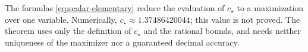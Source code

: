 The formulas \eqref{eq:scalar-elementary} reduce the evaluation of
$c_\star$ to a maximization over one variable. Numerically,
$c_\star\approx1.37486420044$; this value is not proved. The theorem
uses only the definition of $c_\star$ and the rational bounds, and
needs neither uniqueness of the maximizer nor a guaranteed decimal
accuracy.
